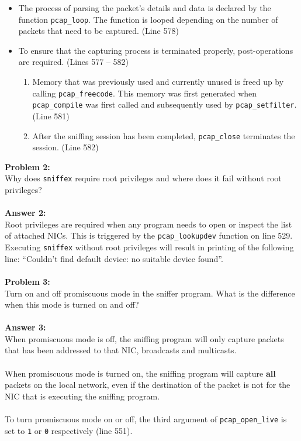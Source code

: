 \documentclass[a4paper,12pt]{article}
\begin{document}
\begin{itemize}
	\item The process of parsing the packet's details and data is declared by the function \texttt{pcap\_loop}. The function is looped depending on the number of packets that need to be captured. (Line 578)
			\item To ensure that the capturing process is terminated properly, post-operations are required. (Lines 577 -- 582)
		\begin{enumerate}
	\item Memory that was previously used and currently unused is freed up by calling \texttt{pcap\_freecode}. This memory was first generated when \texttt{pcap\_compile} was first called and subsequently used by \texttt{pcap\_setfilter}. (Line 581)
	\item After the sniffing session has been completed, \texttt{pcap\_close} terminates the session. (Line 582)
		\end{enumerate}
\end{itemize}
\vspace{1em}
\noindent
\textbf{Problem 2:}\\
Why does \texttt{sniffex} require root privileges and where does it fail without root privileges?\\\\
\textbf{Answer 2:}\\
Root privileges are required when any program needs to open or inspect the list of attached NICs. This is triggered by the \texttt{pcap\_lookupdev} function on line 529. Executing \texttt{sniffex} without root privileges will result in printing of the following line: ``Couldn't find default device: no suitable device found''.\\\\
\textbf{Problem 3:}\\
Turn on and off promiscuous mode in the sniffer program. What is the difference when this mode is turned on and off?\\\\
\textbf{Answer 3:}\\
When promiscuous mode is off, the sniffing program will only capture packets that has been addressed to that NIC, broadcasts and multicasts.\\\\
When promiscuous mode is turned on, the sniffing program will capture \textbf{all} packets on the local network, even if the destination of the packet is not for the NIC that is executing the sniffing program.\\\\To turn promiscuous mode on or off, the third argument of \texttt{pcap\_open\_live} is set to \texttt{1} or \texttt{0} respectively (line 551).
\end{document}
